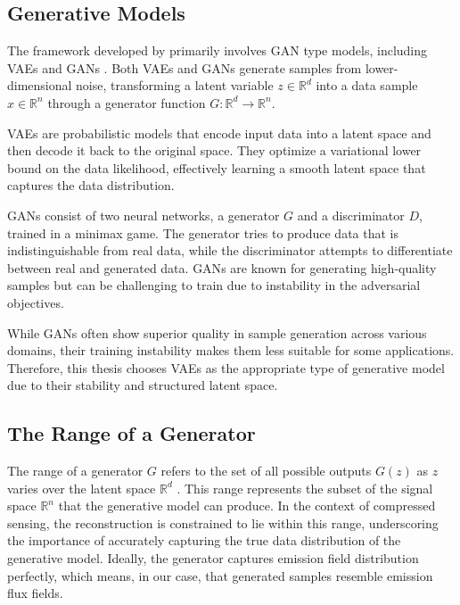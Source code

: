 \subsection{Generative Models}\label{subsec:gen_models}

The framework developed by \textcite{CSUsingAI} primarily involves \gls{GAN} type models, including \gls{VAE}s \parencite{VAE} and \gls{GAN}s \parencite{GAN}.
Both \gls{VAE}s and \gls{GAN}s generate samples from lower-dimensional noise, transforming a latent variable $z \in \mathbb{R}^d$ into a data sample $x \in \mathbb{R}^n$ through a generator function $G: \mathbb{R}^d \to \mathbb{R}^n$.

\gls{VAE}s are probabilistic models that encode input data into a latent space and then decode it back to the original space.
They optimize a variational lower bound on the data likelihood, effectively learning a smooth latent space that captures the data distribution.

\gls{GAN}s consist of two neural networks, a generator $G$ and a discriminator $D$, trained in a minimax game.
The generator tries to produce data that is indistinguishable from real data, while the discriminator attempts to differentiate between real and generated data.
\gls{GAN}s are known for generating high-quality samples but can be challenging to train due to instability in the adversarial objectives.

While \gls{GAN}s often show superior quality in sample generation across various domains, their training instability \parencite{GAN} makes them less suitable for some applications.
Therefore, this thesis chooses \gls{VAE}s as the appropriate type of generative model due to their stability and structured latent space.


\subsection{The Range of a Generator}

The range of a generator $G$ refers to the set of all possible outputs $G(z)$ as $z$ varies over the latent space $\mathbb{R}^d$ \parencite{CSUsingAI}.
This range represents the subset of the signal space $\mathbb{R}^n$ that the generative model can produce.
In the context of compressed sensing, the reconstruction is constrained to lie within this range, underscoring the importance of accurately capturing the true data distribution of the generative model.
Ideally, the generator captures emission field distribution perfectly, which means, in our case, that generated samples resemble emission flux fields.

